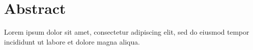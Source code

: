 \chapter*{Abstract}

Lorem ipsum dolor sit amet, consectetur adipiscing elit, sed do eiusmod tempor incididunt ut labore et dolore magna aliqua.